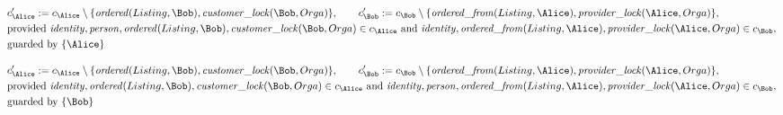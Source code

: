 \begin{align*}
&
c'_
{
\Alice
}
 := 
c_
{
\Alice
}
 \setminus 
\{
\mathit{\detokenize{
ordered
}}
(
Listing
,
\Bob
)
,
\mathit{\detokenize{
customer_lock
}}
(
\Bob
,
Orga
)
\}
, \qquad 
c'_
{
\Bob
}
 := 
c_
{
\Bob
}
 \setminus 
\{
\mathit{\detokenize{
ordered_from
}}
(
Listing
,
\Alice
)
,
\mathit{\detokenize{
provider_lock
}}
(
\Alice
,
Orga
)
\}
,\\
&
\text{provided } 
\mathit{\detokenize{
identity
}}
,
\mathit{\detokenize{
person
}}
,
\mathit{\detokenize{
ordered
}}
(
Listing
,
\Bob
)
,
\mathit{\detokenize{
customer_lock
}}
(
\Bob
,
Orga
)
 \in c_
{
\Alice
}
 \text{ and } 
\mathit{\detokenize{
identity
}}
,
\mathit{\detokenize{
ordered_from
}}
(
Listing
,
\Alice
)
,
\mathit{\detokenize{
provider_lock
}}
(
\Alice
,
Orga
)
 \in c_
{
\Bob
}
,\\
&
\text{guarded by } \{
\Alice
\}
\end{align*}

\begin{align*}
&
c'_
{
\Alice
}
 := 
c_
{
\Alice
}
 \setminus 
\{
\mathit{\detokenize{
ordered
}}
(
Listing
,
\Bob
)
,
\mathit{\detokenize{
customer_lock
}}
(
\Bob
,
Orga
)
\}
, \qquad 
c'_
{
\Bob
}
 := 
c_
{
\Bob
}
 \setminus 
\{
\mathit{\detokenize{
ordered_from
}}
(
Listing
,
\Alice
)
,
\mathit{\detokenize{
provider_lock
}}
(
\Alice
,
Orga
)
\}
,\\
&
\text{provided } 
\mathit{\detokenize{
identity
}}
,
\mathit{\detokenize{
ordered
}}
(
Listing
,
\Bob
)
,
\mathit{\detokenize{
customer_lock
}}
(
\Bob
,
Orga
)
 \in c_
{
\Alice
}
 \text{ and } 
\mathit{\detokenize{
identity
}}
,
\mathit{\detokenize{
person
}}
,
\mathit{\detokenize{
ordered_from
}}
(
Listing
,
\Alice
)
,
\mathit{\detokenize{
provider_lock
}}
(
\Alice
,
Orga
)
 \in c_
{
\Bob
}
,\\
&
\text{guarded by } \{
\Bob
\}
\end{align*}
